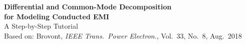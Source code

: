 \documentclass[12pt, a4paper]{article}
\def\color#1{}%
\begin{document}
\begin{center}
    {\LARGE\bfseries\color{emidark}
    Differential and Common-Mode Decomposition\\[4pt]
    for Modeling Conducted EMI}\\[8pt]
    {\large A Step-by-Step Tutorial}\\[4pt]
    {\normalsize Based on: Brovont, \textit{IEEE Trans.\ Power Electron.},
    Vol.~33, No.~8, Aug.~2018}
\end{center}

\tableofcontents
\newpage






\appendix


\end{document}
